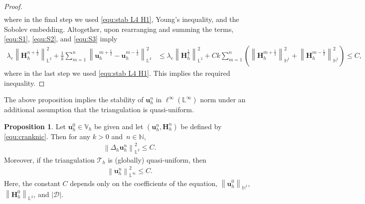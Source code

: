 \documentclass[11pt, reqno]{amsart}
\theoremstyle{definition}
\newtheorem{proposition}[theorem]{Proposition}
\theoremstyle{remark}
\numberwithin{equation}{section}
\newcommand{\bff}{\boldsymbol}
\newcommand{\bb}{\mathbb}
\newcommand{\norm}[2]{\left\|{#1}\right\|_{#2}}
\begin{document}
\begin{proof}
\begin{align}
\end{align}
where in the final step we used \eqref{equ:stab L4 H1}, Young's inequality, and the Sobolev embedding. Altogether, upon rearranging and summing the terms, \eqref{equ:S1}, \eqref{equ:S2}, and \eqref{equ:S3} imply
\begin{align*}
	\lambda_e \norm{\bff{H}_h^{n+\frac{1}{2}}}{\bb{L}^2}^2 
	+
	\frac{1}{k} \sum_{m=1}^n \norm{\bff{u}_h^{m+\frac{1}{2}}- \bff{u}_h^{m-\frac{1}{2}}}{\bb{L}^2}^2
	&\leq
	\lambda_e \norm{\bff{H}_h^{\frac{1}{2}}}{\bb{L}^2}^2
	+
	Ck \sum_{m=1}^n \left( \norm{\bff{H}_h^{m+\frac{1}{2}}}{\bb{H}^1}^2 + \norm{\bff{H}_h^{m-\frac{1}{2}}}{\bb{H}^1}^2 \right)
	\leq C,
\end{align*}
where in the last step we used \eqref{equ:stab L4 H1}. This implies the required inequality.
\end{proof}

The above proposition implies the stability of $\bff{u}_h^n$ in $\ell^\infty(\bb{L}^\infty)$ norm under an additional assumption that the triangulation is quasi-uniform.

\begin{proposition}
Let $\bff{u}_h^0 \in \bb{V}_h$ be given and let $\left(\bff{u}_h^n, \bff{H}_h^n\right)$ be defined by
\eqref{equ:cranknic}. Then for any $k>0$ and~$n\in \bb{N}$,
\begin{align}\label{equ:stab Delta uh}
	\norm{\Delta_h \bff{u}_h^n}{\bb{L}^2}^2 \leq C.
\end{align}
Moreover, if the triangulation $\mathcal{T}_h$ is (globally) quasi-uniform, then
\begin{align}\label{equ:stab uh L infty}
	\norm{\bff{u}_h^n}{\bb{L}^\infty}^2 \leq C.
\end{align}
Here, the constant $C$ depends only on the coefficients of the equation, $\norm{\bff{u}_h^0}{\bb{H}^1}$, $\norm{\bff{H}_h^0}{\bb{L}^2}$, and $|\mathscr{D}|$.
\end{proposition}
\end{document}
